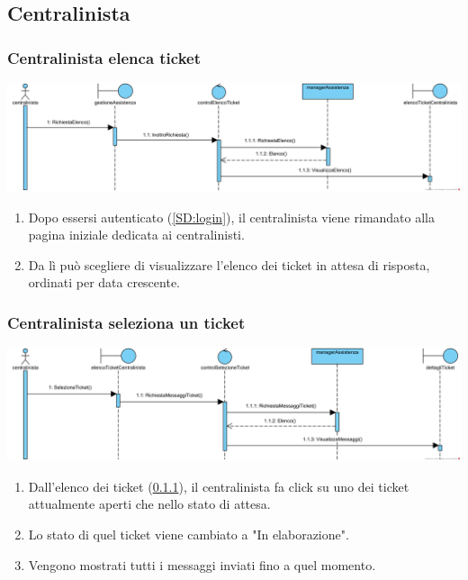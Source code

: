 \documentclass[12pt,a4paper]{article}
\begin{document}
\newpage

\subsection{Centralinista}

\subsubsection{Centralinista elenca ticket}
\label{SD:centralinistaelencaticket}

\begin{center}
\includegraphics[width=\textwidth]{SequenceDiagram/CentralinistaTicketElenco}
\end{center}

\begin{enumerate}
\item Dopo essersi autenticato (\ref{SD:login}), il centralinista viene rimandato alla pagina iniziale dedicata ai centralinisti. 
\item Da lì può scegliere di visualizzare l'elenco dei ticket in attesa di risposta, ordinati per data crescente.
\end{enumerate}

\subsubsection{Centralinista seleziona un ticket}
\label{SD:selezioneticketcentralinista}

\begin{center}
\includegraphics[width=\textwidth]{SequenceDiagram/CentralinistaTicketSeleziona}
\end{center}

\begin{enumerate}
\item Dall'elenco dei ticket (\ref{SD:centralinistaelencaticket}), il centralinista fa click su uno dei ticket attualmente aperti che nello stato di attesa.
\item Lo stato di quel ticket viene cambiato a "In elaborazione".
\item Vengono mostrati tutti i messaggi inviati fino a quel momento.
\end{enumerate}
\end{document}
